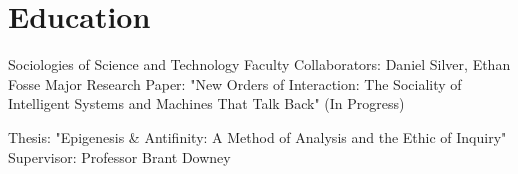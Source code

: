 \section{Education}

    Sociologies of Science and Technology
    Faculty Collaborators: Daniel Silver, Ethan Fosse
    Major Research Paper: "New Orders of Interaction: The Sociality of Intelligent Systems and Machines That Talk Back" (In Progress)

    Thesis: "Epigenesis \& Antifinity: A Method of Analysis and the Ethic of Inquiry"
    Supervisor: Professor Brant Downey

